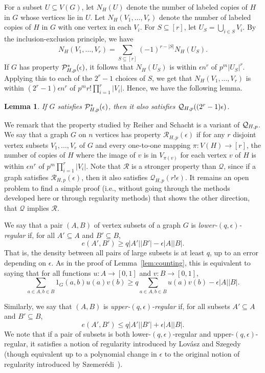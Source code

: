\documentclass[11pt]{article}
\newtheorem{lemma}{Lemma}[section]
\begin{document}
For a subset $U \subseteq V(G)$, let $N_H(U)$ denote the number of labeled copies of $H$ in $G$ whose vertices lie in $U$. Let $N_H(V_1,\ldots,V_r)$ denote the number of labeled copies of $H$ in $G$ with one vertex in each $V_i$. For $S \subseteq [r]$, let $U_S=\bigcup_{i \in S} V_i$. By the inclusion-exclusion principle, we have 
$$N_H(V_1,\ldots,V_r) = \sum_{S \subseteq [r]} (-1)^{r-|S|} N_H(U_S).$$ 
If $G$ has property ${\cal P}^*_{H,p}(\epsilon)$, it follows that $N_H(U_S)$ is within $\epsilon n^r$ of $p^m|U_S|^r$.  Applying this to each of the $2^r - 1$ choices of $S$, we get that $N_H(V_1,\ldots,V_r)$ is within $(2^r-1)\epsilon n^r$ of $p^m r! \prod_{i=1}^r |V_i|$. Hence, we have the following lemma. 

\begin{lemma}\label{easy}
If $G$ satisfies ${\cal P}^*_{H,p}(\epsilon)$, then it also satisfies ${\cal Q}_{H,p}((2^r-1)\epsilon)$.
\end{lemma}

We remark that the property studied by Reiher and Schacht \cite{RS16} is a variant of ${\cal Q}_{H,p}$.  We say that a graph $G$ on $n$ vertices has property $\mathcal{R}_{H,p}(\epsilon)$ if for any $r$ disjoint vertex subsets $V_1,\ldots,V_r$ of $G$ and every one-to-one mapping $\pi:V(H) \rightarrow [r]$, the number of copies of $H$ where the image of $v$ is in $V_{\pi(v)}$ for each vertex $v$ of $H$ is within $\epsilon n^r$ of $p^m\prod_{i=1}^r |V_i|$. Note that $\mathcal{R}$ is a stronger property than $\mathcal{Q}$, since if a graph satisfies $\mathcal{R}_{H,p}(\epsilon)$, then it also satisfies $\mathcal{Q}_{H,p}(r! \epsilon)$. It remains an open problem to find a simple proof (i.e., without going through the methods developed here or through regularity methods) that shows the other direction, that  $\mathcal{Q}$ implies $\mathcal{R}$.

We say that a pair $(A,B)$ of vertex subsets of a graph $G$ is {\it lower-$(q,\epsilon)$-regular} if, for all  $A' \subseteq A$ and $B' \subseteq B$, 
$$e(A',B') \geq q|A'||B'|-\epsilon|A||B|.$$ 
That is, the density between all pairs of large subsets is at least $q$, up to an error depending on $\epsilon$. As in the proof of Lemma~\ref{lem:counting}, this is equivalent to saying that for all functions $u:A \rightarrow [0,1]$ and $v:B \rightarrow [0,1]$, 
$$\sum_{a \in A,b \in B} 1_G(a,b) u(a)v(b) \geq q\sum_{a \in A,b \in B} u(a)v(b) - \epsilon|A||B|.$$ 

Similarly, we say that $(A,B)$ is  {\it upper-$(q,\epsilon)$-regular} if, for all subsets $A' \subseteq A$ and $B' \subseteq B$, 
$$e(A',B') \leq q|A'||B'|+\epsilon|A||B|.$$ 
We note that if a pair of subsets is both lower-$(q,\epsilon)$-regular and upper-$(q,\epsilon)$-regular, it satisfies a notion of regularity introduced by Lov\'asz and Szegedy~\cite{LS} (though equivalent up to a polynomial change in $\epsilon$ to the original notion of regularity introduced by Szemer\'edi~\cite{Sz76}). 
\end{document}
